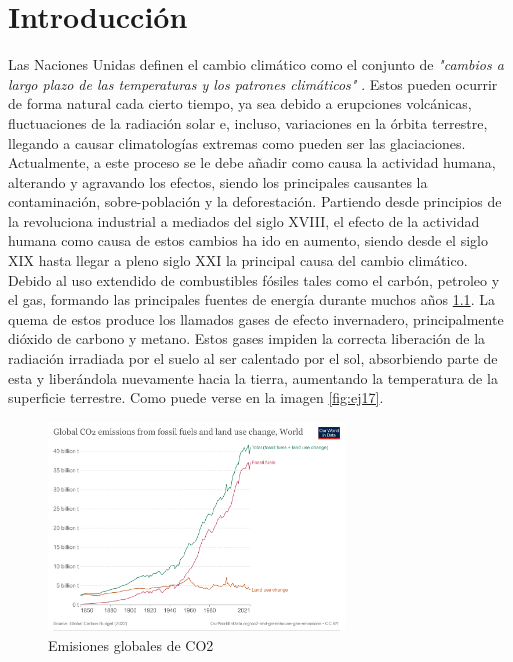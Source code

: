 \chapter[Introducción]{Introducción}
\label{Chap1}

Las Naciones Unidas definen el cambio climático como el conjunto de \textit{"cambios a largo plazo de las temperaturas y los patrones climáticos"} \cite{UNWeb}. Estos pueden ocurrir de forma natural cada cierto tiempo, ya sea debido a erupciones volcánicas, fluctuaciones de la radiación solar e, incluso, variaciones en la órbita terrestre, llegando a causar climatologías extremas como pueden ser las glaciaciones. Actualmente, a este proceso se le debe añadir como causa la actividad humana, alterando y agravando los efectos, siendo los principales causantes la contaminación, sobre-población y la deforestación.\newline
\newline
Partiendo desde principios de la revoluciona industrial a mediados del siglo XVIII, el efecto de la actividad humana como causa de estos cambios ha ido en aumento, siendo desde el siglo XIX hasta llegar a pleno siglo XXI la principal causa del cambio climático. Debido al uso extendido de combustibles fósiles tales como el carbón, petroleo y el gas, formando las principales fuentes de energía durante muchos años \ref{fig:ej16}.\newline
\newline
La quema de estos produce los llamados gases de efecto invernadero, principalmente dióxido de carbono y metano. Estos gases impiden la correcta liberación de la radiación irradiada por el suelo al ser calentado por el sol, absorbiendo parte de esta y liberándola nuevamente hacia la tierra, aumentando la temperatura de la superficie terrestre. Como puede verse en la imagen \ref{fig:ej17}.

\begin{figure} [H]
	\centering
	\includegraphics[width=0.7\textwidth]{fig/global-co2-fossil-plus-land-use.png}
	\caption[Emisiones globales de CO2]{Emisiones globales de CO2 \footnotemark}
	\label{fig:ej16}
\end{figure}

